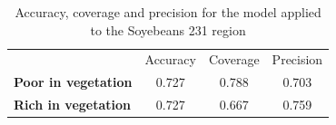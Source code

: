 \documentclass[12pt]{article}
\begin{document}
\begin{table}[hbt]
  \centering
  \caption{Accuracy, coverage and precision for the model applied to the Soyebeans 231 region}\label{tab:sb231_analysis}
  \begin{tabular}{lccc}
    \toprule
    & Accuracy & Coverage & Precision\\
    \cmidrule{2-4}
    \textbf{Poor in vegetation} & 0.727 & 0.788 & 0.703\\
    \textbf{Rich in vegetation} & 0.727 & 0.667 & 0.759\\
    \bottomrule
  \end{tabular}
\end{table}

\end{document}
